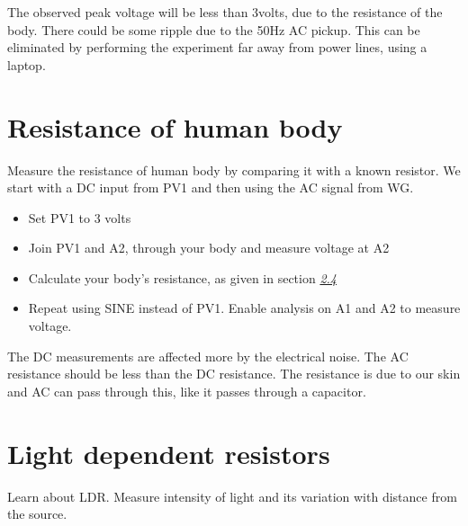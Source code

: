 \documentclass[a4paper,12pt,english]{sphinxmanual}
\let\sphinxpxdimen\pdfpxdimen\else\newdimen\sphinxpxdimen
\begin{document}

The observed peak voltage will be less than 3volts, due to the
resistance of the body. There could be some ripple due to the 50Hz AC
pickup. This can be eliminated by performing the experiment far away
from power lines, using a laptop.


\section{Resistance of human body}
\label{\detokenize{2.13:resistance-of-human-body}}\label{\detokenize{2.13::doc}}

Measure the resistance of human body by comparing it with a known
resistor. We start with a DC input from PV1 and then using the AC signal
from WG.

\noindent\sphinxincludegraphics[width=300\sphinxpxdimen]{{res-body}.pdf}

\begin{itemize}
\item {} 
Set PV1 to 3 volts

\item {} 
Join PV1 and A2, through your body and measure voltage at A2

\item {} 
Calculate your body’s resistance, as given in section
{\hyperref[\detokenize{2.13:sec:Measure-resistance-by-comparison}]{\emph{2.4}}}

\item {} 
Repeat using SINE instead of PV1. Enable analysis on A1 and A2 to
measure voltage.

\end{itemize}


The DC measurements are affected more by the electrical noise. The AC
resistance should be less than the DC resistance. The resistance is due
to our skin and AC can pass through this, like it passes through a
capacitor.


\section{Light dependent resistors}
\label{\detokenize{2.14:light-dependent-resistors}}\label{\detokenize{2.14::doc}}

Learn about LDR. Measure intensity of light and its variation with
distance from the source.
\end{document}

